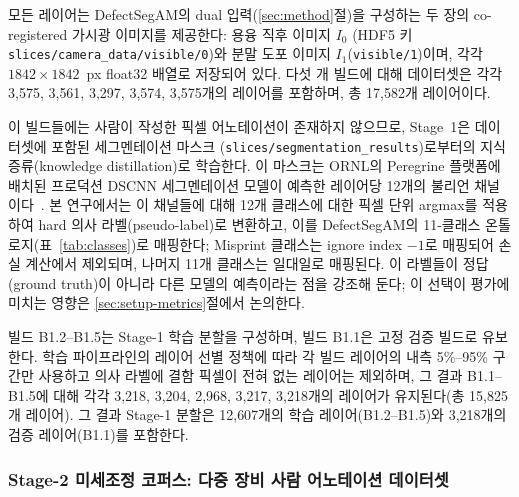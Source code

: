모든 레이어는 DefectSegAM의 dual 입력(\ref{sec:method}절)을 구성하는 두
장의 co-registered 가시광 이미지를 제공한다: 용융 직후 이미지 \(I_0\)
(HDF5 키 \texttt{slices/\allowbreak camera\_data/\allowbreak visible/0})와 분말 도포 이미지
\(I_1\)(\texttt{visible/1})이며, 각각 \(1842 \times 1842\)~px float32
배열로 저장되어 있다. 다섯 개 빌드에 대해 데이터셋은 각각 3{,}575,
3{,}561, 3{,}297, 3{,}574, 3{,}575개의 레이어를 포함하며, 총 17{,}582개
레이어이다.

이 빌드들에는 사람이 작성한 픽셀 어노테이션이 존재하지 않으므로,
Stage~1은 데이터셋에 포함된 세그멘테이션 마스크
(\texttt{slices/\allowbreak segmentation\_\allowbreak results})로부터의 지식 증류(knowledge
distillation)로 학습한다. 이 마스크는 ORNL의 Peregrine 플랫폼에 배치된
프로덕션 DSCNN 세그멘테이션 모델이 예측한 레이어당 12개의 불리언
채널이다~\cite{Scime2020DSCNN}. 본 연구에서는 이 채널들에 대해 12개
클래스에 대한 픽셀 단위 argmax를 적용하여 hard 의사 라벨(pseudo-label)로
변환하고, 이를 DefectSegAM의 11-클래스 온톨로지(표~\ref{tab:classes})로
매핑한다; Misprint 클래스는 ignore index \(-1\)로 매핑되어 손실 계산에서
제외되며, 나머지 11개 클래스는 일대일로 매핑된다. 이 라벨들이 정답
(ground truth)이 아니라 다른 모델의 예측이라는 점을 강조해 둔다; 이
선택이 평가에 미치는 영향은 \ref{sec:setup-metrics}절에서 논의한다.

빌드 B1.2--B1.5는 Stage-1 학습 분할을 구성하며, 빌드 B1.1은 고정 검증
빌드로 유보한다. 학습 파이프라인의 레이어 선별 정책에 따라 각 빌드
레이어의 내측 5\%--95\% 구간만 사용하고 의사 라벨에 결함 픽셀이 전혀
없는 레이어는 제외하며, 그 결과 B1.1--B1.5에 대해 각각 3{,}218,
3{,}204, 2{,}968, 3{,}217, 3{,}218개의 레이어가 유지된다(총 15{,}825개
레이어). 그 결과 Stage-1 분할은 12{,}607개의 학습 레이어(B1.2--B1.5)와
3{,}218개의 검증 레이어(B1.1)를 포함한다.

\subsubsection{Stage-2 미세조정 코퍼스: 다중 장비 사람 어노테이션
데이터셋}\label{sec:setup-stage2-corpus}

